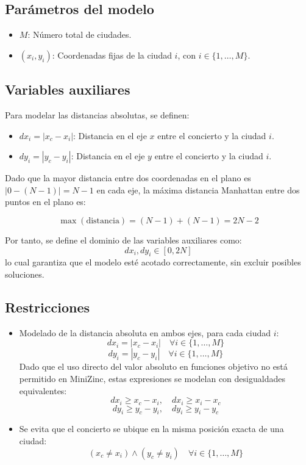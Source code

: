 \documentclass[conference]{IEEEtran}
\begin{document}
\subsection*{Parámetros del modelo}

\begin{itemize}
    \item $M$: Número total de ciudades.
    \item $(x_i, y_i)$: Coordenadas fijas de la ciudad $i$, con $i \in \{1, \dots, M\}$.
\end{itemize}

\subsection*{Variables auxiliares}

Para modelar las distancias absolutas, se definen:

\begin{itemize}
    \item $dx_i = |x_c - x_i|$: Distancia en el eje $x$ entre el concierto y la ciudad $i$.
    \item $dy_i = |y_c - y_i|$: Distancia en el eje $y$ entre el concierto y la ciudad $i$.
\end{itemize}

Dado que la mayor distancia entre dos coordenadas en el plano es $|0 - (N - 1)| = N - 1$ en cada eje, la máxima distancia Manhattan entre dos puntos en el plano es:

\[
\max(\text{distancia}) = (N - 1) + (N - 1) = 2N - 2
\]

Por tanto, se define el dominio de las variables auxiliares como:
\[
dx_i, dy_i \in [0, 2N]
\]
lo cual garantiza que el modelo esté acotado correctamente, sin excluir posibles soluciones.

\subsection*{Restricciones}

\begin{itemize}
    \item Modelado de la distancia absoluta en ambos ejes, para cada ciudad $i$:
    \[
    dx_i = |x_c - x_i| \quad \forall i \in \{1, \dots, M\}
    \]
    \[
    dy_i = |y_c - y_i| \quad \forall i \in \{1, \dots, M\}
    \]
    Dado que el uso directo del valor absoluto en funciones objetivo no está permitido en MiniZinc, estas expresiones se modelan con desigualdades equivalentes:
    \[
    dx_i \geq x_c - x_i,\quad dx_i \geq x_i - x_c
    \]
    \[
    dy_i \geq y_c - y_i,\quad dy_i \geq y_i - y_c
    \]

    \item Se evita que el concierto se ubique en la misma posición exacta de una ciudad:
    \[
    (x_c \ne x_i) \land (y_c \ne y_i) \quad \forall i \in \{1, \dots, M\}
    \]
\end{itemize}
\end{document}

